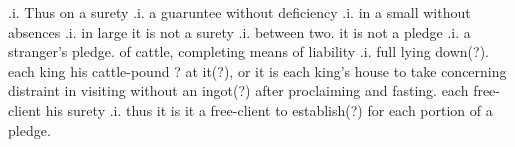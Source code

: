 \documentclass[11pt]{article}
\begin{document}
\begin{pages}
  \begin{Rightside}
    \beginnumbering\pstart
    [\ldots{}?] .i. Thus on a surety .i. a guaruntee without deficiency .i. in a small without absences .i. in large it is not a surety .i. between two.  it is not a pledge .i. a stranger's pledge.  of cattle, completing means of liability .i. full lying down(?).  each king his cattle-pound ? at it(?), or it is each king's house to take concerning distraint in visiting without an ingot(?) after proclaiming and fasting.  each free-client his surety .i. thus it is it a free-client to establish(?) for each portion of a pledge.
    \pend
    \endnumbering
  \end{Rightside}

  \Pages
\end{pages}

\begin{pages}
\begin{Leftside}
    \beginnumbering\pstart

\end{Leftside}
\end{pages}
\end{document}
